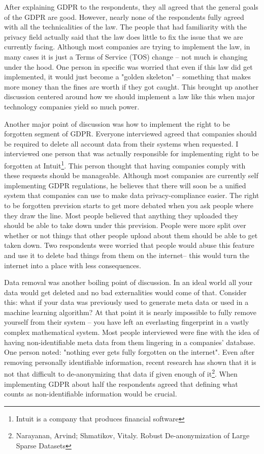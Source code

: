 \documentclass[12pt,
 reprint,
nofootinbib,
 amsmath,amssymb,
 aps,
]{revtex4-2}
\begin{document}
After explaining GDPR to the respondents, they all agreed that the general goals of the GDPR are good.
However, nearly none of the respondents fully agreed with all the technicalities of the law.
The people that had familiarity with the privacy field actually said that the law does little to fix the issue that we are currently facing.
Although most companies are trying to implement the law, in many cases it is just a Terms of Service (TOS) change -- not much is changing under the hood.
One person in specific was worried that even if this law did get implemented, it would just become a "golden skeleton" -- something that makes more money than the fines are worth if they got caught.
This brought up another discussion centered around how we should implement a law like this when major technology companies yield so much power. 

Another major point of discussion was how to implement the right to be forgotten segment of GDPR. 
Everyone interviewed agreed that companies should be required to delete all account data from their systems when requested.
I interviewed one person that was actually responsible for implementing right to be forgotten at Intuit\footnote{Intuit is a company that produces financial software}.
This person thought that having companies comply with these requests should be manageable. 
Although most companies are currently self implementing GDPR regulations, he believes that there will soon be a unified system that companies can use to make data privacy-compliance easier. 
The right to be forgotten prevision starts to get more debated when you ask people where they draw the line.
Most people believed that anything they uploaded they should be able to take down under this prevision.
People were more split over whether or not things that other people upload about them should be able to get taken down.
Two respondents were worried that people would abuse this feature and use it to delete bad things from them on the internet-- this would turn the internet into a place with less consequences. 

Data removal was another boiling point of discussion.
In an ideal world all your data would get deleted and no bad externalities would come of that.
Consider this: what if your data was previously used to generate meta data or used in a machine learning algorithm?
At that point it is nearly impossible to fully remove yourself from their system -- you have left an everlasting fingerprint in a vastly complex mathematical system.
Most people interviewed were fine with the idea of having non-identifiable meta data from them lingering in a companies' database.
One person noted: "nothing ever gets fully forgotten on the internet".
Even after removing personally identifiable information, recent research has shown that it is not that difficult to de-anonymizing that data if given enough of it\footnote{ Narayanan, Arvind; Shmatikov, Vitaly. Robust De-anonymization of Large Sparse Datasets}.
When implementing GDPR about half the respondents agreed that defining what counts as non-identifiable information would be crucial. 
\end{document}
